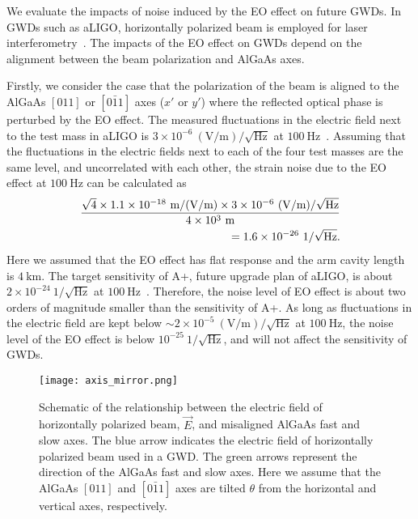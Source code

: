 \documentclass[%
 reprint,
 superscriptaddress,
 amsmath,amssymb,
 aps,
]{revtex4-2}
\newcommand{\unit}[1]{\ \mathrm{#1}}
\begin{document}
We evaluate the impacts of noise induced by the EO effect on future GWDs.
In GWDs such as aLIGO, horizontally polarized beam is employed for laser interferometry~\cite{Aasi2015}.
The impacts of the EO effect on GWDs depend on the alignment between the beam polarization and AlGaAs axes.

Firstly, we consider the case that the polarization of the beam is aligned to the AlGaAs $[011]$ or $[0\bar{1}1]$ axes ($x'$ or $y'$) where the reflected optical phase is perturbed by the EO effect.
The measured fluctuations in the electric field next to the test mass in aLIGO is $3\times10^{-6}\unit{(V/m)/\sqrt{Hz}}$ at $100\unit{Hz}$~\cite{Buikema2020}.
Assuming that the fluctuations in the electric fields next to each of the four test masses are the same level, and uncorrelated with each other, the strain noise due to the EO effect at $100\unit{Hz}$ can be calculated as
\begin{align}
    \frac{\sqrt{4}\times1.1\times10^{-18}\unit{m/(V/m)}\times3\times10^{-6}\unit{(V/m)/\sqrt{Hz}}}{4\times10^3\unit{m}} \notag \\
    = 1.6\times10^{-26}\unit{1/\sqrt{Hz}}.
\end{align}
Here we assumed that the EO effect has flat response and the arm cavity length is $4\unit{km}$.
The target sensitivity of A+, future upgrade plan of aLIGO, is about $2\times10^{-24}\unit{1/{\sqrt{Hz}}}$ at $100\unit{Hz}$~\cite{Barsotti2018a+}.
Therefore, the noise level of EO effect is about two orders of magnitude smaller than the sensitivity of A+.
As long as fluctuations in the electric field are kept below $\sim2\times10^{-5}\unit{(V/m)/\sqrt{Hz}}$ at $100\unit{Hz}$, the noise level of the EO effect is below $10^{-25}\unit{1/\sqrt{Hz}}$, and will not affect the sensitivity of GWDs.


\begin{figure}[htbp]
\texttt{[image: axis\_mirror.png]}
\caption{
Schematic of the relationship between the electric field of horizontally polarized beam, $\vec{E}$, and misaligned AlGaAs fast and slow axes.
The blue arrow indicates the electric field of horizontally polarized beam used in a GWD.
The green arrows represent the direction of the AlGaAs fast and slow axes.
Here we assume that the AlGaAs $[011]$ and $[0\bar{1}1]$ axes are tilted $\theta$ from the horizontal and vertical axes, respectively.
}
\label{fig.tilt}
\end{figure}
\end{document}
